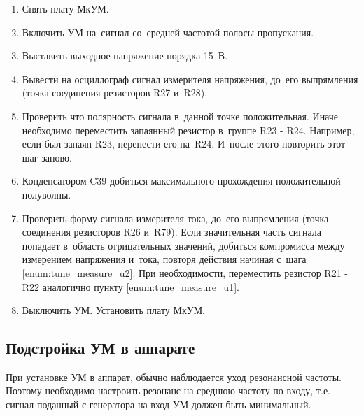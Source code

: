 \begin{enumerate}
	\item Снять плату МкУМ.
	\item Включить УМ на~сигнал со~средней частотой полосы пропускания.
	\item Выставить выходное напряжение порядка 15~В.
	\item Вывести на осциллограф сигнал измерителя напряжения, до~его выпрямления (точка соединения резисторов R27 и~R28).
	\item Проверить что полярность сигнала в~данной точке положительная. Иначе необходимо переместить запаянный резистор в~группе R23 - R24. Например, если был запаян R23, перенести его на~R24. И~после этого повторить этот шаг заново. \label{enum:tune_measure_u1}
	\item Конденсатором C39 добиться максимального прохождения положительной полуволны. \label{enum:tune_measure_u2}
	\item Проверить форму сигнала измерителя тока, до~его выпрямления (точка соединения резисторов R26 и~R79). Если значительная часть сигнала попадает в~область отрицательных значений, добиться компромисса между измерением напряжения и~тока, повторя действия начиная с~шага \ref{enum:tune_measure_u2}. При необходимости, переместить резистор R21 - R22 аналогично пункту \ref{enum:tune_measure_u1}.
	\item Выключить УМ. Установить плату МкУМ.
\end{enumerate}	

\subsection{Подстройка УМ в аппарате}

При установке УМ в аппарат, обычно наблюдается уход резонансной частоты. Поэтому необходимо настроить резонанс на среднюю частоту по входу, т.е. сигнал поданный с генератора на вход УМ должен быть минимальный.